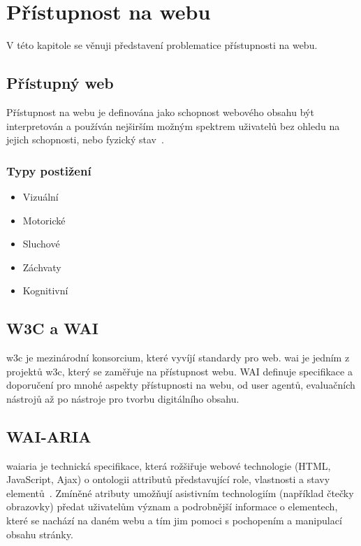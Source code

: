 \chapter{Přístupnost na webu}

V této kapitole se věnuji představení problematice přístupnosti na webu.

\section{Přístupný web}

Přístupnost na webu je definována jako schopnost webového obsahu být interpretován a používán nejširším možným spektrem uživatelů bez ohledu na jejich schopnosti, nebo fyzický stav~\cite{w3-accessibility}.

\subsection{Typy postižení}


\begin{itemize}
  \item Vizuální
  \item Motorické
  \item Sluchové
  \item Záchvaty
  \item Kognitivní
\end{itemize}

\section{W3C a WAI}


\gls{w3c} je mezinárodní konsorcium, které vyvíjí standardy pro web.
\gls{wai} je jedním z projektů \gls{w3c}, který se zaměřuje na přístupnost webu.
WAI definuje specifikace a doporučení pro mnohé aspekty přístupnosti na webu, od user agentů, evaluačních nástrojů až po nástroje pro tvorbu digitálního obsahu.

\section{WAI-ARIA}

\gls{waiaria} je technická specifikace, která rožšiřuje webové technologie (HTML, JavaScript, Ajax) o ontologii attributů představující role, vlastnosti a stavy elementů~\cite{wai-aria}.
Zmíněné atributy umožňují asistivním technologiím (například čtečky obrazovky) předat uživatelům význam a podrobnější informace o elementech, které se nachází na daném webu a tím jim pomoci s pochopením a manipulací obsahu stránky.

